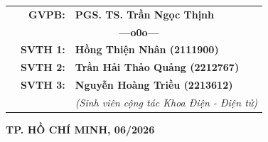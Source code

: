\begin{titlepage}
\begin{center}
\begin{table}[h]
\begin{tabular}{p{3.5cm} r l}
                & \textbf{GVPB:} & \textbf{PGS. TS. Trần Ngọc Thịnh} \\
                & \multicolumn{2}{c}{\textbf{---o0o---}} \\
                & \textbf{SVTH 1:} & \textbf{Hồng Thiện Nhân (2111900)} \\
                & \textbf{SVTH 2:} & \textbf{Trần Hải Thảo Quảng (2212767)} \\
                & \textbf{SVTH 3:} & \textbf{Nguyễn Hoàng Triều (2213612)} \\
                & & \textit{(Sinh viên cộng tác Khoa Điện - Điện tử)} \\
            \end{tabular}
        \end{table}

        \vfill

        \textbf{\fontsize{15pt}{18pt}\selectfont TP. HỒ CHÍ MINH, 06/2026}

    \end{center}

    \restoregeometry
\end{titlepage}

